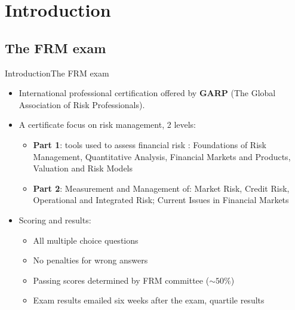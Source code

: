 
\section{Introduction}
\subsection{The FRM exam}
\begin{frame}{Introduction}{The FRM exam}

\begin{itemize}
	\item International professional certification offered by \textbf{GARP} (The Global Association of Risk Professionals). 
	\item A certificate focus on risk management, 2 levels:
	\begin{itemize}
		\item \textbf{Part 1}: tools used to assess financial risk : Foundations of Risk Management, Quantitative Analysis, Financial Markets and Products, Valuation and Risk Models
		\item \textbf{Part 2}: Measurement and Management of: Market Risk, Credit Risk, Operational and Integrated Risk; Current Issues in Financial Markets
	\end{itemize} 
	\item Scoring and results:
	\begin{itemize}
		\item All multiple choice questions
		\item No penalties for wrong answers
		\item Passing scores determined by FRM committee ($\sim 50\%$)
		\item Exam results emailed six weeks after the exam, quartile results
	\end{itemize}   
\end{itemize}
\end{frame}

